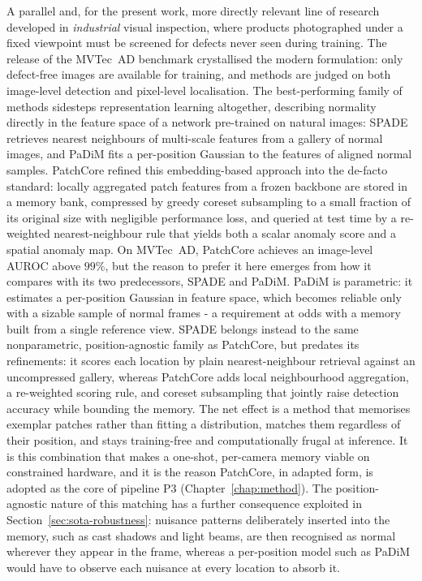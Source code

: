 A parallel and, for the present work, more directly relevant line of research
developed in \emph{industrial} visual inspection, where products photographed
under a fixed viewpoint must be screened for defects never seen during
training. The release of the MVTec~AD benchmark \cite{Bergmann2019}
crystallised the modern formulation: only defect-free images are available for
training, and methods are judged on both image-level detection and pixel-level
localisation. The best-performing family of methods sidesteps representation
learning altogether, describing normality directly in the feature space of a
network pre-trained on natural images: SPADE \cite{Cohen2020} retrieves
nearest neighbours of multi-scale features from a gallery of normal images,
and PaDiM \cite{Defard2021} fits a per-position Gaussian to the features of
aligned normal samples. PatchCore \cite{Roth2022} refined this embedding-based
approach into the de-facto standard: locally aggregated patch features from a
frozen backbone are stored in a memory bank, compressed by greedy coreset
subsampling to a small fraction of its original size with negligible
performance loss, and queried at test time by a re-weighted nearest-neighbour
rule that yields both a scalar anomaly score and a spatial anomaly map. On
MVTec~AD, PatchCore achieves an image-level AUROC above $99\%$, but the
reason to prefer it here emerges from how it compares with its two predecessors,
SPADE and PaDiM. PaDiM is parametric: it estimates a per-position Gaussian in
feature space, which becomes reliable only with a sizable sample of normal
frames - a requirement at odds with a memory built from a single reference view.
SPADE belongs instead to the same nonparametric, position-agnostic family as
PatchCore, but predates its refinements: it scores each location by plain
nearest-neighbour retrieval against an uncompressed gallery, whereas PatchCore
adds local neighbourhood aggregation, a re-weighted scoring rule, and coreset
subsampling that jointly raise detection accuracy while bounding the memory. The
net effect is a method that memorises exemplar patches rather than fitting a
distribution, matches them regardless of their position, and stays training-free
and computationally frugal at inference. It is this combination that makes a one-shot, per-camera memory
viable on constrained hardware, and it is the reason PatchCore, in adapted form,
is adopted as the core of pipeline P3 (Chapter~\ref{chap:method}). The
position-agnostic nature of this matching has a further consequence exploited in
Section~\ref{sec:sota-robustness}: nuisance patterns deliberately inserted into
the memory, such as cast shadows and light beams, are then recognised as normal
wherever they appear in the frame, whereas a per-position model such as PaDiM
would have to observe each nuisance at every location to absorb it.


